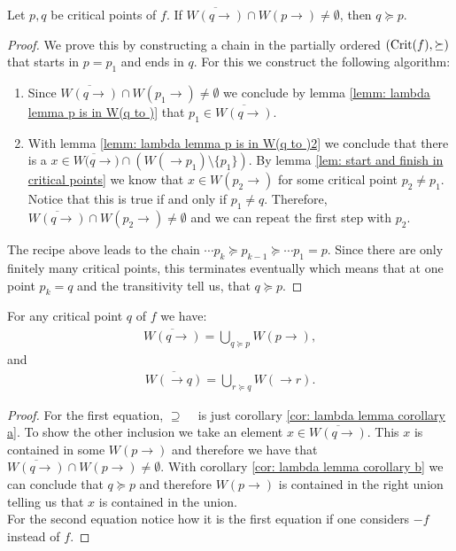 \begin{corollary} \label{cor: lambda lemma corollary b}
Let $p,q$ be critical points of $f$. If $\overline{W(q \to)}\cap W(p \to) \neq \emptyset$, then $q \succeq p$.
\end{corollary}
\begin{proof}
We prove this by constructing a chain in the partially ordered $(\mathrm{Crit}(f),\succeq)$ that starts in $p=p_1$ and ends in $q$. For this we construct the following algorithm: 
\begin{enumerate}
\item Since $\overline{W(q \to)}\cap W(p_1 \to) \neq \emptyset$ we conclude by lemma \ref{lemm: lambda lemma p is in W(q to )} that $p_1 \in \overline{W(q \to)}$.
\item  With lemma \ref{lemm: lambda lemma p is in W(q to )2} we conclude that there is a $x\in \overline{W(q \to})\cap(W(\to p_1)\setminus \{p_1 \})$. By lemma \ref{lem: start and finish in critical points} we know that $x\in W(p_2\to)$ for some critical point $p_2 \neq p_1$. Notice that this is true if and only if $p_1 \neq q$. Therefore, $\overline{W(q \to)}\cap W(p_2 \to ) \neq \emptyset$ and we can repeat the first step with $p_2$.
\end{enumerate}
The recipe above leads to the chain $\cdots p_k \succeq p_{k-1} \succeq \cdots p_1=p$. Since there are only finitely many critical points, this terminates eventually which means that at one point $p_k=q$ and the transitivity tell us, that $q\succeq p$.
\end{proof}
\begin{corollary}\label{cor: lambda lemma closer of (un-)stabnle sets}
For any critical point $q$ of $f$ we have:
\begin{align*}
\overline{W(q \to)}=\bigcup_{q \succeq p} W(p \to), 
\end{align*}and 
\begin{align*}
\overline{W(\to q )}=\bigcup_{r \succeq q} W(\to r). 
\end{align*}
\end{corollary}
\begin{proof}
For the first equation, \glqq $\supseteq$ \grqq~ is just corollary \ref{cor: lambda lemma corollary a}. To show the other inclusion we take an element $x\in \overline{W(q \to)}$. This $x$ is contained in some $W(p \to)$ and therefore we have that $\overline{W(q \to)} \cap W(p \to)\neq \emptyset$. With corollary \ref{cor: lambda lemma corollary b} we can conclude that $q\succeq p$ and therefore $W(p \to)$ is contained in the right union telling us that $x$ is contained in the union. \\
For the second equation notice how it is the first equation if one considers $-f$ instead of $f$. 
\end{proof}
